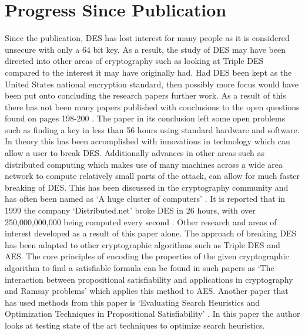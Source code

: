 \documentclass[11pt,a4paper, notitlepage]{report}
\begin{document}
\section{Progress Since Publication}
\label{sec:ProgressSP}
Since the publication, DES has lost interest for many people as it is considered unsecure with only a 64 bit key. As a result, the study of DES may have been directed into other areas of cryptography such as looking at Triple DES compared to the interest it may have originally had. Had DES been kept as the United States national encryption standard, then possibly more focus would have been put onto concluding the research papers further work. As a result of this there has not been many papers published with conclusions to the open questions found on pages 198-200 \cite{Fabio2000LogicalSAT}.
The paper in its conclusion left some open problems such as finding a key in less than 56 hours using standard hardware and software. In theory this has been accomplished with innovations in technology which can allow a user to break DES. Additionally advances in other areas such as distributed computing which makes use of many machines across a wide area network to compute relatively small parts of the attack, can allow for much faster breaking of DES. This has been discussed in the cryptography community and has often been named as `A huge cluster of computers' \cite{Junod2013LASEC}. It is reported that in 1999 the company `Distributed.net' broke DES in 26 hours, with over 250,000,000,000 being computed every second \cite{Junod2013LASEC}. 
Other research and areas of interest developed as a result of this paper alone. The approach of breaking DES has been adapted to other cryptographic algorithms such as Triple DES and AES. The core principles of encoding the properties of the given cryptographic algorithm to find a satisfiable formula can be found in such papers as `The interaction between propositional satisfiability and applications in cryptography and Ramsay problems' \cite{Gwynne2010Interaction} which applies this method to AES. Another paper that has used methods from this paper is `Evaluating Search Heuristics and Optimization Techniques in Propositional Satisfiability' \cite{Giunchiglia01evaluatingsearch}. In this paper the author looks at testing state of the art techniques to optimize search heuristics. 
\end{document}
